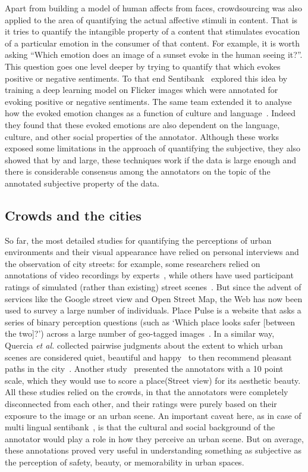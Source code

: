 Apart from building a model of human affects from faces, crowdsourcing was also applied to the area of quantifying the actual affective stimuli in content. That is it tries to quantify the intangible property of a content that stimulates evocation of a particular emotion in the consumer of that content. For example, it is worth asking ``Which emotion does an image of a sunset evoke in the human seeing it?''. This question goes one level deeper by trying to quantify that which evokes positive or negative sentiments. To that end Sentibank~\cite{SentiBank} explored this idea by training a deep learning model on Flicker images which were annotated for evoking positive or negative sentiments. The same team extended it to analyse how the evoked emotion changes as a function of culture and language~\cite{pappas2016multilingual}. Indeed they found that these evoked emotions are also dependent on the language, culture, and other social properties of the annotator. Although these works exposed some limitations in the approach of quantifying the subjective, they also showed that by and large, these techniques work if the data is large enough and there is considerable consensus among the annotators on the topic of the annotated subjective property of the data.


\subsection{Crowds and the cities}
So far, the most detailed studies for quantifying the perceptions of urban environments and their visual appearance have relied on personal interviews and the observation of city streets: for example, some researchers relied on annotations of video recordings by experts~\cite{sampson04seeing}, while others have used participant ratings of simulated (rather than existing) street scenes~\cite{lindal2012}. 
But since the advent of services like the Google street view and Open Street Map, the Web has now been used to survey a large number of individuals. Place Pulse is a website that asks a series of binary perception questions (such as `Which place looks safer [between the two]?') across a large number of geo-tagged images~\cite{salesses2013collaborative}. In a similar way, Quercia \emph{et al.} collected pairwise judgments about the extent to which urban scenes are considered quiet, beautiful and happy~\cite{quercia2014aesthetic} to then recommend pleasant paths in the city~\cite{quercia2014shortest}. Another study~\cite{seresinhe2015quantifying} presented the annotators with a 10 point scale, which they would use to score a place(Street view) for its aesthetic beauty. 
All these studies relied on the crowds, in that the annotators were completely disconnected from each other, and their ratings were purely based on their exposure to the image or an urban scene. An important caveat here, as in case of multi lingual sentibank~\cite{pappas2016multilingual}, is that the cultural and social background of the annotator would play a role in how they perceive an urban scene.
But on average, these annotations proved very useful in understanding something as subjective as the perception of safety, beauty, or memorability in urban spaces. 

